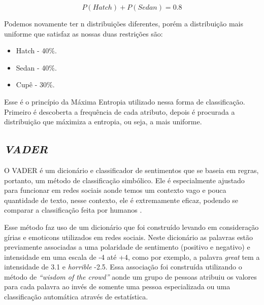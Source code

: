 \[ P(Hatch) + P (Sedan) = 0.8 \]

Podemos novamente ter n distribuições diferentes, porém a distribuição mais
uniforme que satisfaz as nossas duas restrições são:

\begin{itemize}
  \item Hatch - 40\%.
  \item Sedan - 40\%.
  \item Cupê - 30\%.
\end{itemize}

Esse é o princípio da Máxima Entropia utilizado nessa forma de classificação.
Primeiro é descoberta a frequência de cada atributo, depois é procurada a
distribuição que máximiza a entropia, ou seja, a mais uniforme.








\subsection{\textit{VADER}}

O \ac{VADER} é um dicionário e classificador de sentimentos que se baseia em
regras, portanto, um método de classificação simbólico. Ele é especialmente
ajustado para funcionar em redes sociais aonde temos um contexto vago e pouca
quantidade de texto, nesse contexto, ele é extremamente eficaz, podendo se
comparar a classificação feita por humanos \cite{conf/icwsm/HuttoG14}.

Esse método faz uso de um dicionário que foi construído levando em consideração
gírias e emoticons utilizados em redes sociais. Neste dicionário as palavras
estão previamente associadas a uma polaridade de sentimento (positivo e
negativo) e intensidade em uma escala de -4 até +4, como por exemplo, a palavra
\textit{great} tem a intensidade de 3.1 e \textit{horrible} -2.5. Essa
associação foi construída utilizando o método de \textit{``wisdom of the
crowd''} aonde um grupo de pessoas atribuiu os valores para cada palavra ao
invés de somente uma pessoa especializada ou uma classificação automática
através de estatística.

